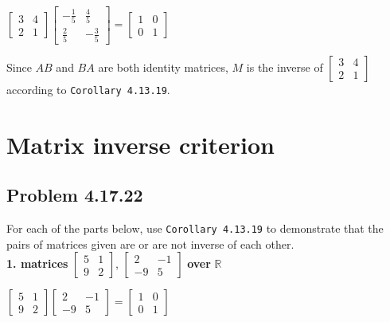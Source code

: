 \documentclass[
  letterpaper,
  DIV=11,
  numbers=noendperiod]{scrartcl}
\begin{document}
\(\begin{bmatrix}3 &4\\2 &1\end{bmatrix} \begin{bmatrix}-\frac{1}{5} &\frac{4}{5}\\\frac{2}{5} &-\frac{3}{5}\end{bmatrix} = \begin{bmatrix}1 &0\\0 &1\end{bmatrix}\)

Since \(AB\) and \(BA\) are both identity matrices, \(M\) is the inverse
of \(\begin{bmatrix} 3 & 4 \\ 2 & 1 \end{bmatrix}\) according to
\texttt{Corollary\ 4.13.19}.

\newpage{}

\hypertarget{matrix-inverse-criterion}{%
\section{Matrix inverse criterion}\label{matrix-inverse-criterion}}

\hypertarget{problem-4.17.22}{%
\subsection{Problem 4.17.22}\label{problem-4.17.22}}

For each of the parts below, use \texttt{Corollary\ 4.13.19} to
demonstrate that the pairs of matrices given are or are not inverse of
each other.\\
\textbf{1. matrices} \(\begin{bmatrix} 5 & 1 \\ 9 & 2 \end{bmatrix}\),
\(\begin{bmatrix} 2 & -1 \\ -9 & 5 \end{bmatrix}\) \textbf{over}
\(\bm{\mathbb{R}}\)

\(\begin{bmatrix}5 &1\\9 &2\end{bmatrix} \begin{bmatrix}2 &-1\\-9 &5\end{bmatrix} = \begin{bmatrix}1 &0\\0 &1\end{bmatrix}\)
\end{document}
